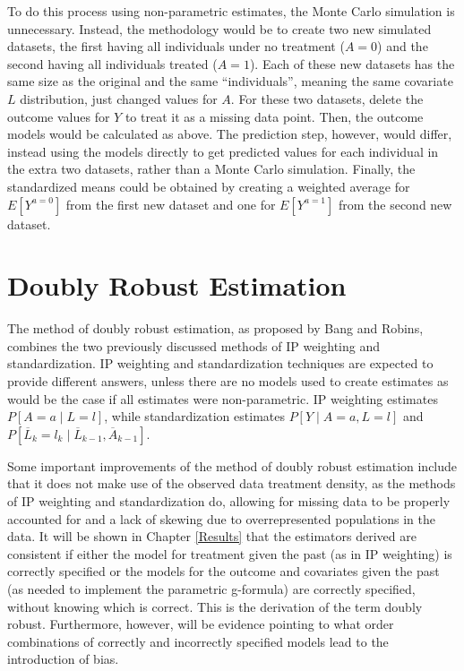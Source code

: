 To do this process using non-parametric estimates, the Monte Carlo simulation is unnecessary.  Instead, the methodology would be to create two new simulated datasets, the first having all individuals under no treatment ($A=0$) and the second having all individuals treated ($A=1$).  Each of these new datasets has the same size as the original and the same ``individuals'', meaning the same covariate $L$ distribution, just changed values for $A$.  For these two datasets, delete the outcome values for $Y$ to treat it as a missing data point.  Then, the outcome models would be calculated as above.  The prediction step, however, would differ, instead using the models directly to get predicted values for each individual in the extra two datasets, rather than a Monte Carlo simulation.  Finally, the standardized means could be obtained by creating a weighted average for $E[Y^{a=0}]$ from the first new dataset and one for $E[Y^{a=1}]$ from the second new dataset.  

\section{Doubly Robust Estimation} 
The method of doubly robust estimation, as proposed by Bang and Robins,\cite{bang2005doubly} combines the two previously discussed methods of IP weighting and standardization.  IP weighting and standardization techniques are expected to provide different answers, unless there are no models used to create estimates as would be the case if all estimates were non-parametric.  \cite{hernan_robins_2016}   IP weighting estimates $P[A=a \mid L =l]$, while standardization estimates $P[Y \mid A = a, L=l]$ and $P[\overline{L}_k =l_k \mid \overline{L}_{k-1}, \overline{A}_{k-1}]$.  

Some important improvements of the method of doubly robust estimation include that it does not make use of the observed data treatment density, as the methods of IP weighting and standardization do, allowing for missing data to be properly accounted for and a lack of skewing due to overrepresented populations in the data.  It will be shown in Chapter \ref{Results} that the estimators derived are consistent if either the model for treatment given the past (as in IP weighting) is correctly specified or the models for the outcome and covariates given the past (as needed to implement the parametric g-formula) are correctly specified, without knowing which is correct.  This is the derivation of the term doubly robust.  Furthermore, however, will be evidence pointing to what order combinations of correctly and incorrectly specified models lead to the introduction of bias.  

